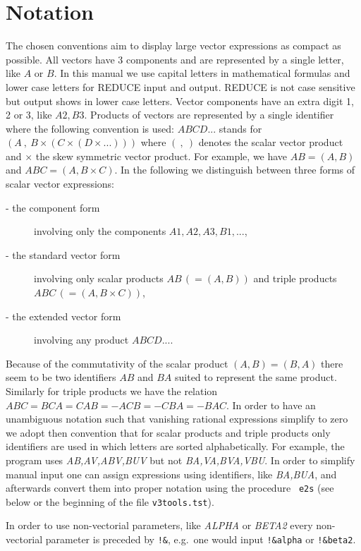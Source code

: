 \documentclass[12pt]{article}
\begin{document}
\section{Notation}
The chosen conventions aim to display large vector expressions as
compact as possible. All vectors have 3 components and are
represented by a single letter, like $A$ or $B$. In this manual we use
capital letters in mathematical formulas and lower case letters for REDUCE
input and output. REDUCE is not case sensitive but output shows in lower
case letters. Vector components have an extra digit 1, 2 or 3, like $A2,
B3$. Products of vectors are represented by a single identifier where
the following convention is used: $ABCD...$ stands for $(A\ ,\ B
\times (C \times (D \times ...)))$ where $(\ ,\ )$ denotes the
scalar vector product and $\times$ the skew symmetric vector
product. For example, we have $AB = (A,B)$ and $ABC=(A,B\times C)$.
In the following we distinguish between three forms of scalar vector
expressions:
\begin{description}
\item[- the component form] involving only the components
        $A1,A2,A3,B1,...$,
\item[- the standard vector form] involving only scalar products
        $AB\,(=(A,B))$ and triple products $ABC\,(=(A,B \times C))$,
\item[- the extended vector form] involving any product $ABCD...$.
\end{description}
Because of the commutativity of the scalar product $(A,B)=(B,A)$ there
seem to be two identifiers $AB$ and $BA$ suited to represent the same
product. Similarly for triple products we have the relation
$ABC=BCA=CAB=-ACB=-CBA=-BAC$. In order to have an unambiguous
notation such that vanishing rational expressions simplify to zero we
adopt then convention that for scalar products and triple products
only identifiers are used in which letters are sorted
alphabetically. For example, the program uses {\it AB,AV,ABV,BUV} but
not {\it BA,VA,BVA,VBU}. In order to simplify manual input one can
assign expressions using identifiers, like {\it BA,BUA}, and afterwards
convert them into proper notation using the procedure {\tt
e2s} (see below or the beginning of the file {\tt v3tools.tst}).

In order to use non-vectorial parameters, like {\it ALPHA} or {\it BETA2}
every non-vectorial parameter is preceded by {\tt !\&}, e.g.\
one would input {\tt !\&alpha} or {\tt !\&beta2}.
\end{document}
